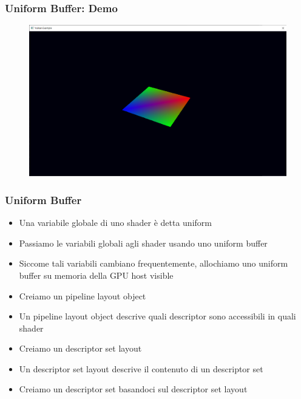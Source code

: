 \begin{frame}
\frametitle{Uniform Buffer: Demo}
\begin{figure}[ht]
    \centering
    \includegraphics[scale=0.25]{images/SlidesUniforms/RenderQuad.png}
\end{figure}
\end{frame}

\begin{frame}
\frametitle{Uniform Buffer}
\begin{itemize}
\item Una variabile globale di uno shader è detta uniform
\item Passiamo le variabili globali agli shader usando uno uniform buffer
\item Siccome tali variabili cambiano frequentemente, allochiamo uno uniform buffer su memoria della GPU host visible
\item Creiamo un pipeline layout object
\item Un pipeline layout object descrive quali descriptor sono accessibili in quali shader
\item Creiamo un descriptor set layout
\item Un descriptor set layout descrive il contenuto di un descriptor set
\item Creiamo un descriptor set basandoci sul descriptor set layout
\end{itemize}
\end{frame}
